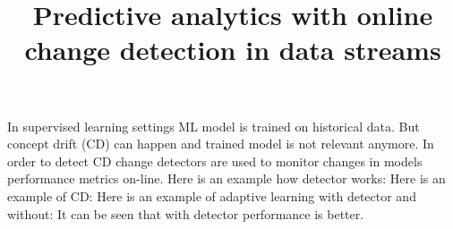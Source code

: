 \documentclass[12 pt]{article}
\title{Predictive analytics with online change detection in data streams}
\date{}
\begin{document}
	\maketitle
  In supervised learning settings ML model is trained on historical data.
  But concept drift (CD) can happen and trained model is not relevant anymore.
  In order to detect CD change detectors are used to monitor changes in models performance metrics on-line. 
  Here is an example how detector works:
  Here is an example of CD:
  Here is an example of adaptive learning with detector and without:
  It can be seen that with detector performance is better.
\end{document}
